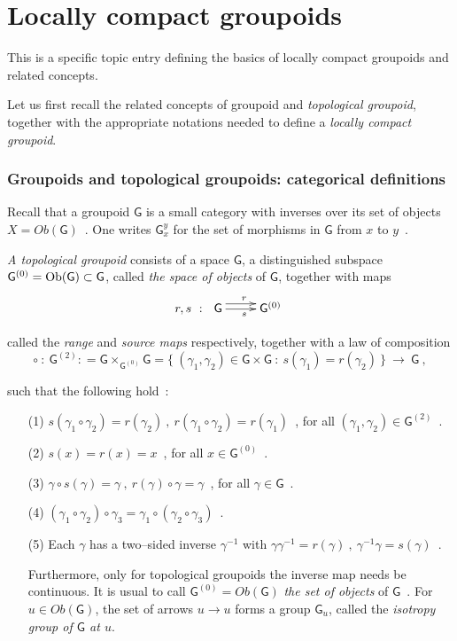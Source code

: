 \documentclass[12pt]{article}
\theoremstyle{plain}
\theoremstyle{definition}
\numberwithin{equation}{section}
\newcommand{\grp}{{\mathsf{G}}}
\newcommand{\obg}{{\rm Ob(\mathsf{G)}}}
\newcommand{\lra}{{\longrightarrow}}
\newcommand{\<}{{\langle}}
\begin{document}
\section{Locally compact groupoids}
 This is a specific topic entry defining the basics of locally compact groupoids and related concepts. 

 Let us first recall the related concepts of groupoid and \emph{topological groupoid}, 
together with the appropriate notations needed to define a \emph{locally compact groupoid}.
 
\subsubsection{Groupoids and topological groupoids: categorical definitions}

 Recall that a groupoid $\grp$ is a small category with inverses 
over its set of objects $X = Ob(\grp)$~. One writes $\grp^y_x$ for 
the set of morphisms in $\grp$ from $x$ to $y$~. 

 \emph{A topological groupoid} consists of a space $\grp$, a distinguished subspace 
$\grp^{(0)} = \obg \subset \grp$, called {\it the space of objects} of $\grp$, 
together with maps
\begin{equation}
r,s~:~ \xymatrix{ \grp \ar@<1ex>[r]^r \ar[r]_s & \grp^{(0)} }
\end{equation}

called the {\it range} and {\it source maps} respectively,
together with a law of composition
\begin{equation}
\circ~:~ \grp^{(2)}: = \grp \times_{\grp^{(0)}} \grp = \{
~(\gamma_1, \gamma_2) \in \grp \times \grp ~:~ s(\gamma_1) =
r(\gamma_2)~ \}~ \lra ~\grp~,
\end{equation}

such that the following hold~:~
\begin{enumerate}
\item[(1)]
$s(\gamma_1 \circ \gamma_2) = r(\gamma_2)~,~ r(\gamma_1 \circ
\gamma_2) = r(\gamma_1)$~, for all $(\gamma_1, \gamma_2) \in
\grp^{(2)}$~.

\item[(2)]
$s(x) = r(x) = x$~, for all $x \in \grp^{(0)}$~.

\item[(3)]
$\gamma \circ s(\gamma) = \gamma~,~ r(\gamma) \circ \gamma =
\gamma$~, for all $\gamma \in \grp$~.

\item[(4)]
$(\gamma_1 \circ \gamma_2) \circ \gamma_3 = \gamma_1 \circ
(\gamma_2 \circ \gamma_3)$~.

\item[(5)]
Each $\gamma$ has a two--sided inverse $\gamma^{-1}$ with $\gamma
\gamma^{-1} = r(\gamma)~,~ \gamma^{-1} \gamma = s (\gamma)$~.

Furthermore, only for topological groupoids the inverse map needs be continuous.
It is usual to call $\grp^{(0)} = Ob(\grp)$ {\it the set of objects}
of $\grp$~. For $u \in Ob(\grp)$, the set of arrows $u \lra u$ forms a
group $\grp_u$, called the \emph{isotropy group of $\grp$ at $u$}.
\end{enumerate}
\end{document}
